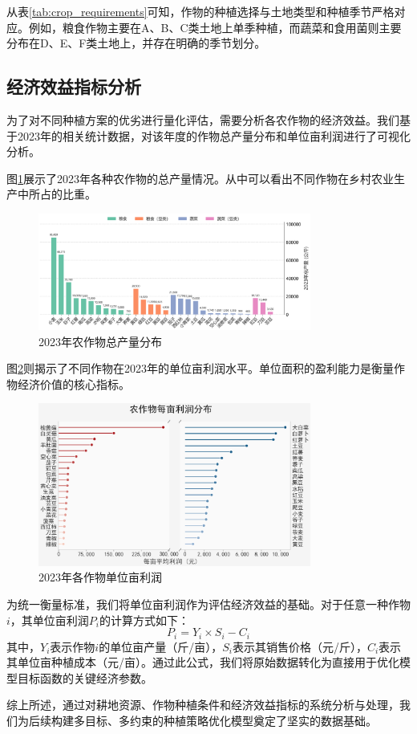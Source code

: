 从表\ref{tab:crop_requirements}可知，作物的种植选择与土地类型和种植季节严格对应。例如，粮食作物主要在A、B、C类土地上单季种植，而蔬菜和食用菌则主要分布在D、E、F类土地上，并存在明确的季节划分。

\subsection{经济效益指标分析}

为了对不同种植方案的优劣进行量化评估，需要分析各农作物的经济效益。我们基于2023年的相关统计数据，对该年度的作物总产量分布和单位亩利润进行了可视化分析。

图\ref{fig:production_distribution_2023}展示了2023年各种农作物的总产量情况。从中可以看出不同作物在乡村农业生产中所占的比重。

\begin{figure}[htbp]
    \centering
    \includegraphics[width=0.8\textwidth]{figs/2数据分析与预处理/2023年产量分布.png}
    \caption{2023年农作物总产量分布}
    \label{fig:production_distribution_2023}
\end{figure}

图\ref{fig:profit_per_mu_2023}则揭示了不同作物在2023年的单位亩利润水平。单位面积的盈利能力是衡量作物经济价值的核心指标。

\begin{figure}[htbp]
    \centering
    \includegraphics[width=0.8\textwidth]{figs/2数据分析与预处理/2023年单位亩利润.png}
    \caption{2023年各作物单位亩利润}
    \label{fig:profit_per_mu_2023}
\end{figure}

为统一衡量标准，我们将单位亩利润作为评估经济效益的基础。对于任意一种作物$i$，其单位亩利润$P_i$的计算方式如下：
\begin{equation}
    P_i = Y_i \times S_i - C_i
    \label{eq:profit}
\end{equation}
其中，$Y_i$表示作物$i$的单位亩产量（斤/亩），$S_i$表示其销售价格（元/斤），$C_i$表示其单位亩种植成本（元/亩）。通过此公式，我们将原始数据转化为直接用于优化模型目标函数的关键经济参数。

综上所述，通过对耕地资源、作物种植条件和经济效益指标的系统分析与处理，我们为后续构建多目标、多约束的种植策略优化模型奠定了坚实的数据基础。
